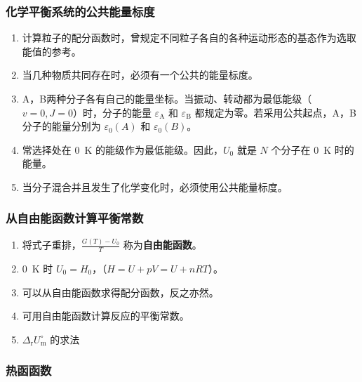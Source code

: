 \subsubsection{化学平衡系统的公共能量标度}

\begin{enumerate}
    \item 计算粒子的配分函数时，曾规定不同粒子各自的各种运动形态的基态作为选取能值的参考。
    \item 当几种物质共同存在时，必须有一个公共的能量标度。
    \item A，B两种分子各有自己的能量坐标。当振动、转动都为最低能级（$v = 0, J = 0$）时，分子的能量 $\varepsilon_{\mathrm{A}}$ 和 $\varepsilon_{\mathrm{B}}$ 都规定为零。若采用公共起点，A，B分子的能量分别为 $\varepsilon_0(A)$ 和 $\varepsilon_0(B)$。
    \item 常选择处在 \qty{0}{\kelvin} 的能级作为最低能级。因此，$U_0$ 就是 $N$ 个分子在 \qty{0}{\kelvin} 时的能量。
    \item 当分子混合并且发生了化学变化时，必须使用公共能量标度。
\end{enumerate}

\subsubsection{从自由能函数计算平衡常数}

\begin{enumerate}
    \item 将式子重排，$\displaystyle \frac{G(T)-U_0}{T}$ 称为\textbf{自由能函数}。
    \item \qty{0}{\kelvin} 时 $U_0 = H_0$，（$H = U + pV = U + nRT$）。
    \item 可以从自由能函数求得配分函数，反之亦然。
    \item 可用自由能函数计算反应的平衡常数。
    \item $\Delta_{\mathrm{r}}U_{\mathrm{m}}^{\circ}$ 的求法
\end{enumerate}

\subsubsection{热函函数}
